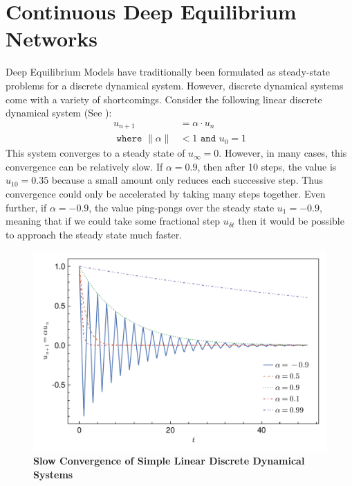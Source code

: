 
\section{Continuous Deep Equilibrium Networks}
\label{sec:continuous_deqs}

Deep Equilibrium Models have traditionally been formulated as steady-state problems for a discrete dynamical system. However, discrete dynamical systems come with a variety of shortcomings. Consider the following linear discrete dynamical system (See ):
%
\begin{align}
    u_{n + 1}                   & = \alpha \cdot u_n         \\
    \texttt{ where } \|\alpha\| & < 1 \texttt{ and } u_0 = 1
\end{align}
%
This system converges to a steady state of $u_\infty = 0$. However, in many cases, this convergence can be relatively slow. If $\alpha = 0.9$, then after 10 steps, the value is $u_{10} = 0.35$ because a small amount only reduces each successive step. Thus convergence could only be accelerated by taking many steps together. Even further, if $\alpha = -0.9$, the value ping-pongs over the steady state $u_{1} = -0.9$, meaning that if we could take some fractional step $u_{\delta t}$ then it would be possible to approach the steady state much faster.

\begin{figure}[H]
    \centering
    \includegraphics[width=0.8\linewidth]{../figures/deep_equilibrium_models/linear_discrete_dynamical_system.pdf}
    \caption{\textbf{Slow Convergence of Simple Linear Discrete Dynamical Systems}}
    \label{fig:linear_discrete_dynamical_system}
\end{figure}

